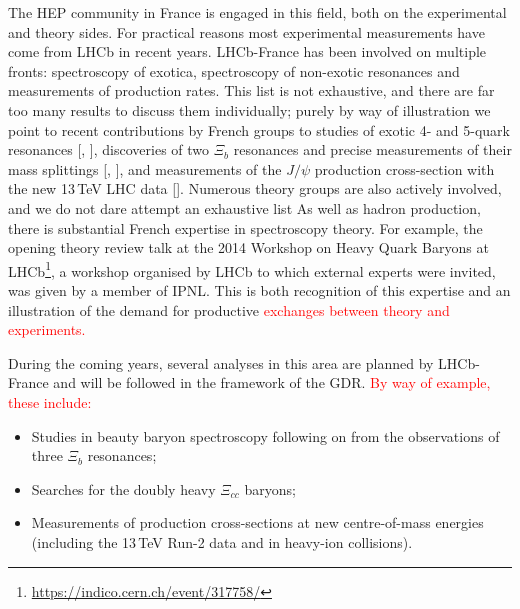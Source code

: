 The HEP community in France is engaged in this field, both on
the experimental and theory sides. For practical reasons most
experimental measurements have come from LHCb in recent years.
LHCb-France has been involved on multiple fronts:
spectroscopy of exotica,  %
spectroscopy of non-exotic resonances %
and measurements of production rates.  %
This list is not exhaustive, and there are far too many
results to discuss them individually; purely by way of
illustration we point to recent contributions by French groups to
%
studies of exotic 4- and 5-quark resonances
[\cite{Aaij:2016ymb}, \cite{Aaij:2014jqa}],
%
discoveries of two $\Xi_b$ resonances and precise measurements
of their mass splittings [\cite{Aaij:2016jnn}, \cite{Aaij:2014yka}],
%
and measurements of the $J/\psi$ production cross-section
with the new 13\,TeV LHC data
[\cite{Aaij:2015rla}].
Numerous theory groups are also actively involved, and
we do not dare attempt an exhaustive list%
As well as hadron production, there is substantial French
expertise in spectroscopy theory. For example, the opening
theory review talk at the 
2014 Workshop on Heavy Quark Baryons at LHCb\footnote{
  \url{https://indico.cern.ch/event/317758/}
}, a workshop organised by LHCb to which external experts were invited,
was given by a member of IPNL. This is both recognition of
this expertise and an illustration of the demand for
productive \textcolor{red}{exchanges between theory and experiments.}

%



During the coming years, several analyses in this area are
planned by LHCb-France and will be followed in the framework of the GDR. 
\textcolor{red}{By way of example, these include:}

\begin{itemize}
\item Studies in beauty baryon spectroscopy following on from the observations
of three $\Xi_b$ resonances;
\item Searches for the doubly heavy
$\Xi_{cc}$ baryons;
\item Measurements of production cross-sections
at new centre-of-mass energies (including the 13\,TeV Run-2
data and in heavy-ion collisions).
\end{itemize}


